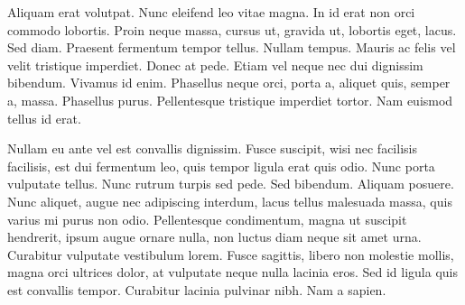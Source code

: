 \documentclass[11pt]{article}
\begin{document}
Aliquam erat volutpat.  Nunc eleifend leo vitae magna.  In id erat non
orci commodo lobortis.  Proin neque massa, cursus ut, gravida ut,
lobortis eget, lacus.  Sed diam.  Praesent fermentum tempor tellus.
Nullam tempus.  Mauris ac felis vel velit tristique imperdiet.  Donec
at pede.  Etiam vel neque nec dui dignissim bibendum.  Vivamus id
enim.  Phasellus neque orci, porta a, aliquet quis, semper a, massa.
Phasellus purus.  Pellentesque tristique imperdiet tortor.  Nam
euismod tellus id erat. 


Nullam eu ante vel est convallis dignissim.  Fusce suscipit, wisi nec
facilisis facilisis, est dui fermentum leo, quis tempor ligula erat
quis odio.  Nunc porta vulputate tellus.  Nunc rutrum turpis sed pede.
Sed bibendum.  Aliquam posuere.  Nunc aliquet, augue nec adipiscing
interdum, lacus tellus malesuada massa, quis varius mi purus non odio.
Pellentesque condimentum, magna ut suscipit hendrerit, ipsum augue
ornare nulla, non luctus diam neque sit amet urna.  Curabitur
vulputate vestibulum lorem.  Fusce sagittis, libero non molestie
mollis, magna orci ultrices dolor, at vulputate neque nulla lacinia
eros.  Sed id ligula quis est convallis tempor.  Curabitur lacinia
pulvinar nibh.  Nam a sapien. 
\end{document}
